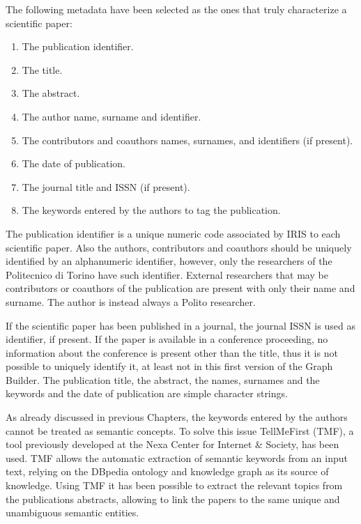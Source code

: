 \documentclass[%
    corpo=13.5pt,
    twoside,
    oldstyle,
    tipotesi=magistrale,
    greek,
    evenboxes
]{toptesi}
\begin{document}
The following metadata have been selected as the ones that truly characterize a
scientific paper:

\begin{enumerate}
    \item The publication identifier.
    \item The title.
    \item The abstract.
    \item The author name, surname and identifier.
    \item The contributors and coauthors names, surnames, and identifiers
        (if present).
    \item The date of publication.
    \item The journal title and ISSN (if present).
    \item The keywords entered by the authors to tag the publication.
\end{enumerate}

The publication identifier is a unique numeric code associated by IRIS to each
scientific paper. Also the authors, contributors and coauthors should be
uniquely identified by an alphanumeric identifier, however, only the researchers
of the Politecnico di Torino have such identifier. External
researchers that may be contributors or coauthors of the publication are present
with only their name and surname.
The author is instead always a Polito researcher.

If the scientific paper has been published in a journal, the journal ISSN
is used as identifier, if present.
If the paper is available in a conference proceeding, no information about the conference
is present other than the title, thus it is not possible to uniquely identify
it, at least not in this first version of the Graph Builder.
The publication title, the abstract, the names, surnames and the keywords and
the date of publication are simple character strings.

As already discussed in previous Chapters, the keywords entered by the authors
cannot be treated as semantic concepts.
To solve this issue TellMeFirst (TMF), a tool previously developed at the
Nexa Center for Internet \& Society, has been used.
TMF allows the automatic extraction of semantic keywords from an input text,
relying on the DBpedia ontology and knowledge graph as its source of knowledge.
Using TMF it has been possible to extract the relevant topics from the
publications abstracts, allowing to link the papers to the same unique and
unambiguous semantic entities.
\end{document}
